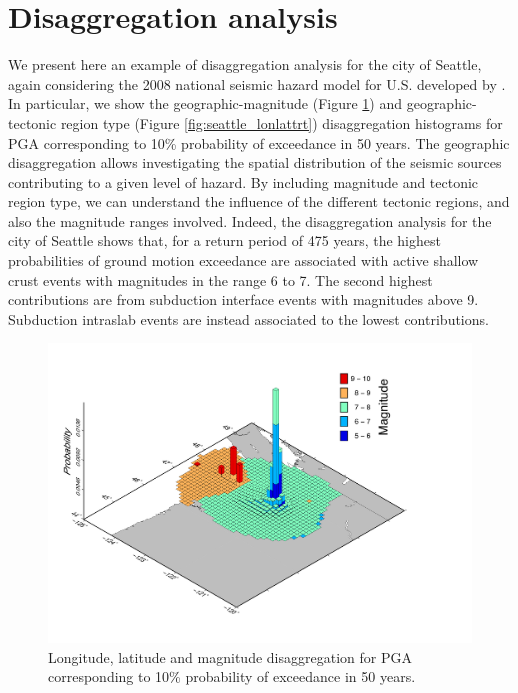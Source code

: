 \section{Disaggregation analysis}
We present here an example of disaggregation analysis for the city of Seattle,
again considering the 2008 national seismic hazard model for U.S. developed by
\citet{petersen2008}. In particular, we show the geographic-magnitude (Figure
\ref{fig:seattle_lonlatmag}) and geographic-tectonic region type (Figure
\ref{fig:seattle_lonlattrt}) disaggregation histograms for PGA corresponding to
10\% probability of exceedance in 50 years. The geographic disaggregation allows
investigating the spatial distribution of the seismic sources contributing to a
given level of hazard. By including magnitude and tectonic region type, we can
understand the influence of the different tectonic regions, and also the
magnitude ranges involved.  Indeed, the disaggregation analysis for the city of
Seattle shows that, for a return period of 475 years, the highest probabilities
of ground motion exceedance are associated with active shallow crust events with
magnitudes in the range 6 to 7. The second highest contributions are from
subduction interface events with magnitudes above 9. Subduction intraslab events
are instead associated to the lowest contributions.
\begin{figure}
\centering
\includegraphics[width=14cm]{./Pictures/Seattle_Lon_Lat_Mag.pdf}
\caption{Longitude, latitude and magnitude disaggregation for PGA corresponding to 10\% probability of exceedance in 50 years.}
\label{fig:seattle_lonlatmag}
\end{figure}

